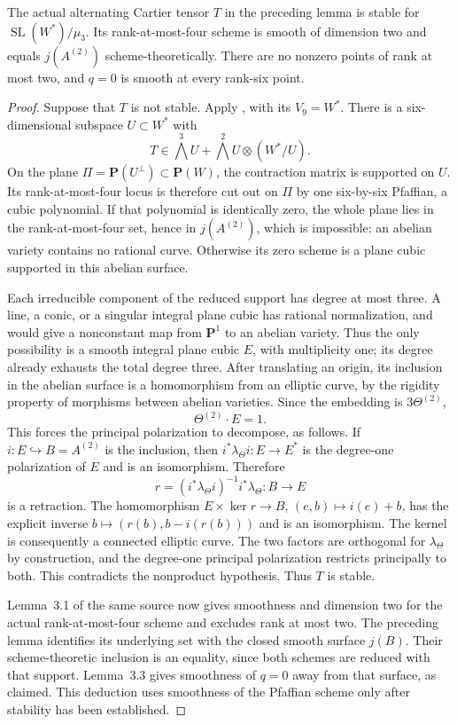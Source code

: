 \begin{lemma}
\label{lem:root-nonordinary-Cartier-stability-candidate}
The actual alternating Cartier tensor $T$ in the preceding lemma
is stable for $\operatorname{SL}(W^*)/\mu_3$.
Its rank-at-most-four scheme is smooth of dimension two and equals
$j(A^{(2)})$ scheme-theoretically. There are no nonzero points of
rank at most two, and $q=0$ is smooth at every rank-six point.
\end{lemma}
\begin{proof}
Suppose that $T$ is not stable. Apply
\citet[Proposition~2.12 and the proof of Lemma~3.2]
{RainsSam2018Trivectors}, with its $V_9=W^*$.
There is a six-dimensional subspace $U\subset W^*$ with
\[
 T\in\bigwedge^3U+\bigwedge^2U\otimes(W^*/U).
\]
On the plane $\Pi=\mathbf P(U^\perp)\subset\mathbf P(W)$,
the contraction matrix is supported on $U$. Its rank-at-most-four
locus is therefore cut out on $\Pi$ by one six-by-six Pfaffian,
a cubic polynomial. If that polynomial is identically zero, the
whole plane lies in the rank-at-most-four set, hence in $j(A^{(2)})$,
which is impossible: an abelian variety contains no rational curve.
Otherwise its zero scheme is a plane cubic supported in this
abelian surface.

Each irreducible component of the reduced support has degree at
most three. A line, a conic, or a singular integral plane cubic
has rational normalization, and would give a nonconstant map
from $\mathbf P^1$ to an abelian variety. Thus the only possibility
is a smooth integral plane cubic $E$, with multiplicity one; its
degree already exhausts the total degree three. After translating
an origin, its inclusion in the abelian surface is a homomorphism
from an elliptic curve, by the rigidity property of morphisms
between abelian varieties. Since the embedding is $3\Theta^{(2)}$,
\[
                         \Theta^{(2)}\cdot E=1.
\]
This forces the principal polarization to decompose, as follows.
If $i:E\hookrightarrow B=A^{(2)}$ is the inclusion, then
$i^*\lambda_\Theta i:E\to E^*$ is the degree-one polarization
of $E$ and is an isomorphism. Therefore
\[
 r=(i^*\lambda_\Theta i)^{-1}i^*\lambda_\Theta:B\to E
\]
is a retraction. The homomorphism
$E\times\ker r\to B$, $(e,b)\mapsto i(e)+b$, has the explicit
inverse $b\mapsto(r(b),b-i(r(b)))$ and is an isomorphism.
The kernel is consequently a connected elliptic curve. The two
factors are orthogonal for $\lambda_\Theta$ by construction, and
the degree-one principal polarization restricts principally to
both. This contradicts the nonproduct hypothesis.
Thus $T$ is stable.

Lemma~3.1 of the same source now gives smoothness and dimension two
for the actual rank-at-most-four scheme and excludes rank at most
two. The preceding lemma identifies its underlying set with the
closed smooth surface $j(B)$. Their scheme-theoretic inclusion
is an equality, since both schemes are reduced with that support.
Lemma~3.3 gives smoothness of $q=0$ away from that surface, as
claimed. This deduction uses smoothness of the Pfaffian scheme
only after stability has been established.
\end{proof}

